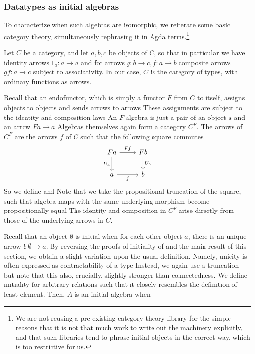 \subsubsection{Datatypes as initial algebras}
To characterize when such algebras are isomorphic, we reiterate some basic category theory, simultaneously rephrasing it in Agda terms.\footnote{We are not reusing a pre-existing category theory library for the simple reasons that it is not that much work to write out the machinery explicitly, and that such libraries tend to phrase initial objects in the correct way, which is too restrictive for us.}

Let $C$ be a category, and let $a, b, c$ be objects of $C$, so that in particular we have identity arrows $1_a : a \to a$ and for arrows $g : b \to c, f : a \to b$ composite arrows $gf : a \to c$ subject to associativity. In our case, $C$ is the category of types, with ordinary functions as arrows.

Recall that an endofunctor, which is simply a functor $F$ from $C$ to itself, assigns objects to objects and sends arrows to arrows
These assignments are subject to the identity and composition laws
An $F$-algebra is just a pair of an object $a$ and an arrow $Fa \to a$
Algebras themselves again form a category $C^F$. The arrows of $C^F$ are the arrows $f$ of $C$ such that the following square commutes%
\[\begin{tikzcd}[ampersand replacement=\&]
	Fa \& Fb \\
	a \& b
	\arrow["f"', from=2-1, to=2-2]
	\arrow["{U_a}"', from=1-1, to=2-1]
	\arrow["{U_b}", from=1-2, to=2-2]
	\arrow["Ff", from=1-1, to=1-2]
\end{tikzcd}\]
So we define
and
Note that we take the propositional truncation of the square, such that algebra maps with the same underlying morphism become propositionally equal
The identity and composition in $C^F$ arise directly from those of the underlying arrows in $C$.

Recall that an object $\emptyset$ is initial when for each other object $a$, there is an unique arrow $!: \emptyset \to a$. By reversing the proofs of initiality of  and the main result of this section, we obtain a slight variation upon the usual definition. Namely, unicity is often expressed as contractability of a type
Instead, we again use a truncation
but note that this also, crucially, slightly stronger than connectedness. We define initiality for arbitrary relations
such that it closely resembles the definition of least element. Then, $A$ is an initial algebra when

